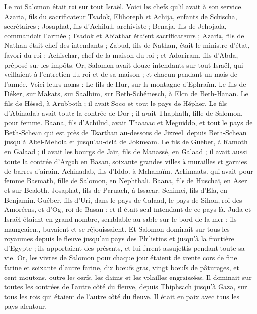 \begin{multicols}{2}
\VerseOne{}Le roi Salomon était roi sur tout Israël.
Voici les chefs qu’il avait à son service. Azaria, fils du sacrificateur Tsadok,
Elihoreph et Achija, enfants de Schischa, secrétaires ; Josaphat, fils d'Achilud, archiviste ;
Benaja, fils de Jehojada, commandait l'armée ; Tsadok et Abiathar étaient sacrificateurs ;
Azaria, fils de Nathan était chef des intendants ; Zabud, fils de Nathan, était le ministre d’état, favori du roi ;
Achischar, chef de la maison du roi ; et Adoniram, fils d’Abda, préposé sur les impôts.
Or, Salomon avait douze intendants sur tout Israël, qui veillaient à l’entretien du roi et de sa maison ; et chacun pendant un mois de l'année.
Voici leurs noms : Le fils de Hur, sur la montagne d'Ephraïm.
Le fils de Déker, sur Makats, sur Saalbim, sur Beth-Schémesch, à Elon de Beth-Hanan.
Le fils de Hésed, à Arubboth ; il avait Soco et tout le pays de Hépher.
Le fils d'Abinadab avait toute la contrée de Dor ; il avait Thaphath, fille de Salomon, pour femme.
Baana, fils d'Achilud, avait Thaanac et Meguiddo, et tout le pays de Beth-Schean qui est près de Tsarthan au-dessous de Jizreel, depuis Beth-Schean jusqu'à Abel-Mehola et jusqu'au-delà de Jokmeam.
Le fils de Guéber, à Ramoth en Galaad ; il avait les bourgs de Jaïr, fils de Manassé, en Galaad ; il avait aussi toute la contrée d'Argob en Basan, soixante grandes villes à murailles et garnies de barres d'airain.
Achinadab, fils d’Iddo, à Mahanaïm.
Achimaats, qui avait pour femme Basmath, fille de Salomon, en Nephthali.
Baana, fils de Huschaï, en Aser et sur Bealoth.
Josaphat, fils de Paruach, à Issacar.
Schimeï, fils d'Ela, en Benjamin.
Guéber, fils d'Uri, dans le pays de Galaad, le pays de Sihon, roi des Amoréens, et d’Og, roi de Basan ; et il était seul intendant de ce pays-là.
Juda et Israël étaient en grand nombre, semblable au sable sur le bord de la mer ; ils mangeaient, buvaient et se réjouissaient.
Et Salomon dominait sur tous les royaumes depuis le fleuve jusqu'au pays des Philistins et jusqu'à la frontière d'Egypte ; ils apportaient des présents, et lui furent assujettis pendant toute sa vie.
Or, les vivres de Salomon pour chaque jour étaient de trente cors de fine farine et soixante d'autre farine,
dix bœufs gras, vingt bœufs de pâturages, et cent moutons, outre les cerfs, les daims et les volailles engraissées.
Il dominait sur toutes les contrées de l’autre côté du fleuve, depuis Thiphsach jusqu'à Gaza, sur tous les rois qui étaient de l’autre côté du fleuve. Il était en paix avec tous les pays alentour.

\end{multicols}
